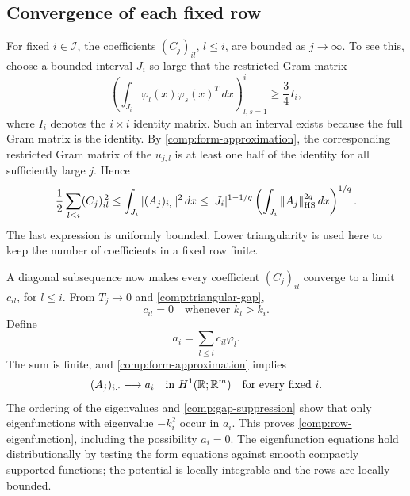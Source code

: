 \subsection{Convergence of each fixed row}
\label{comp:rows}

For fixed $i\in\mathcal I$, the coefficients $(C_j)_{il}$, $l\leq i$,
are bounded as $j\to\infty$.  To see this, choose a bounded interval $J_i$
so large that the restricted Gram matrix
\[
 \left(\int_{J_i}\varphi_l(x)\varphi_s(x)^T\,dx
       \right)_{l,s=1}^{i}\geq\frac34 I_i,
\]
where $I_i$ denotes the $i\times i$ identity matrix.
Such an interval exists because the full Gram matrix is the identity.
By \eqref{comp:form-approximation}, the corresponding restricted Gram
matrix of the $u_{j,l}$ is at least one half of the identity for all
sufficiently large $j$.  Hence
\[
 \frac12\sum_{l\leq i}(C_j)_{il}^{\,2}
 \leq\int_{J_i}|(A_j)_{i,\cdot}|^2\,dx
 \leq |J_i|^{1-1/q}
        \left(\int_{J_i}\|A_j\|_{\mathrm{HS}}^{2q}\,dx\right)^{1/q}.
\]
The last expression is uniformly bounded.  Lower triangularity is used
here to keep the number of coefficients in a fixed row finite.

A diagonal subsequence now makes every coefficient $(C_j)_{il}$ converge
to a limit $c_{il}$, for $l\leq i$.  From
$T_j\to0$ and \eqref{comp:triangular-gap},
\begin{equation}
 c_{il}=0\quad\text{whenever }k_l>k_i.
 \label{comp:gap-suppression}
\end{equation}
Define
\[
 a_i=\sum_{l\leq i}c_{il}\varphi_l.
\]
The sum is finite, and \eqref{comp:form-approximation} implies
\begin{equation}
 (A_j)_{i,\cdot}\longrightarrow a_i
       \quad\text{in }H^1(\mathbb R;\mathbb R^m)
       \quad\text{for every fixed }i.
 \label{comp:row-convergence}
\end{equation}
The ordering of the eigenvalues and \eqref{comp:gap-suppression} show
that only eigenfunctions with eigenvalue $-k_i^2$ occur in $a_i$.
This proves \eqref{comp:row-eigenfunction}, including the possibility
$a_i=0$.  The eigenfunction equations hold distributionally by testing
the form equations against smooth compactly supported functions; the
potential is locally integrable and the rows are locally bounded.

